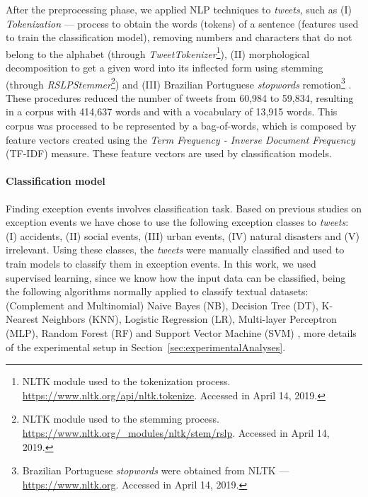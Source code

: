 \documentclass[runningheads]{llncs}
\begin{document}
After the preprocessing phase, we applied NLP techniques to \textit{tweets}, such as (I) \textit{Tokenization} --- process to obtain the words (tokens) of a sentence (features used to train the classification model), removing numbers and characters that do not belong to the alphabet (through \textit{TweetTokenizer}\footnote{NLTK module used to the tokenization process. \url{https://www.nltk.org/api/nltk.tokenize}. Accessed in April 14, 2019.}), (II) morphological decomposition to get a given word into its inflected form using stemming (through \textit{RSLPStemmer}\footnote{NLTK module used to the stemming process. \url{https://www.nltk.org/\_modules/nltk/stem/rslp}. Accessed in April 14, 2019.}) and (III) Brazilian Portuguese \textit{stopwords} remotion\footnote{Brazilian Portuguese \textit{stopwords} were obtained from NLTK --- \url{https://www.nltk.org}. Accessed in April 14, 2019.} \cite{Setiawan2017, nadkarni2011natural, Korenius, roy2017understanding, collobert2011natural}. These procedures reduced the number of tweets from 60,984 to 59,834, resulting in a corpus with 414,637 words and with a vocabulary of 13,915 words. This corpus was processed to be represented by a bag-of-words, which is composed by feature vectors created using the \textit{Term Frequency - Inverse Document Frequency} (TF-IDF) measure. These feature vectors are used by classification models.


\paragraph{\textbf{Classification model}}
\label{featuresEng}




Finding exception events involves classification task. Based on previous studies on exception events \cite{Itoh2016, Chen2016, Lecue2014, Gal-Tzur2014} we have chose to use the following exception classes to \textit{tweets}: (I) accidents, (II) social events, (III) urban events, (IV) natural disasters and (V) irrelevant. Using these classes, the \textit{tweets} were manually classified and used to train models to classify them in exception events. In this work, we used supervised learning, since we know how the input data can be classified, being the following algorithms normally applied to classify textual datasets: (Complement and Multinomial) Naive Bayes (NB), Decision Tree (DT), K-Nearest Neighbors (KNN), Logistic Regression (LR), Multi-layer Perceptron (MLP), Random Forest (RF) and Support Vector Machine (SVM) \cite{kotsiantis2007supervised, dwivedi2016automatic, narayanan2017survey}, more details of the experimental setup in Section~\ref{sec:experimentalAnalyses}.
\end{document}
